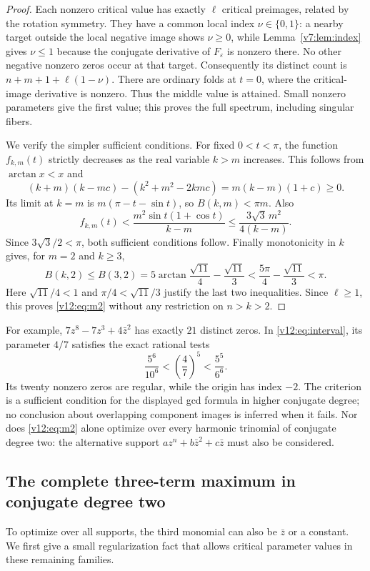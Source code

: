 \documentclass[UTF8,11pt]{ctexart}
\theoremstyle{definition}
\numberwithin{equation}{section}
\begin{document}
\begin{proof}
Each nonzero critical value has exactly $\ell$ critical preimages,
related by the rotation symmetry. They have a common local index
$\nu\in\{0,1\}$: a nearby target outside the local negative image
shows $\nu\ge0$, while Lemma~\ref{v7:lem:index} gives $\nu\le1$
because the conjugate derivative of $F_\varepsilon$ is nonzero
there. No other negative nonzero zeros occur at that target.
Consequently its distinct count is
$n+m+1+\ell(1-\nu)$. There are ordinary folds at $t=0$,
where the critical-image derivative is nonzero. Thus the middle
value is attained. Small nonzero parameters give the first value;
this proves the full spectrum, including singular fibers.

We verify the simpler sufficient conditions. For fixed $0<t<\pi$,
the function $f_{k,m}(t)$ strictly decreases as the real variable
$k>m$ increases. This follows from $\arctan x<x$ and
\[
 (k+m)(k-mc)-(k^2+m^2-2kmc)=m(k-m)(1+c)\ge0.
\]
Its limit at $k=m$ is $m(\pi-t-\sin t)$, so $B(k,m)<\pi m$.
Also
\[
 f_{k,m}(t)<\frac{m^2\sin t(1+\cos t)}{k-m}
 \le\frac{3\sqrt3\,m^2}{4(k-m)}.
\]
Since $3\sqrt3/2<\pi$, both sufficient conditions follow.
Finally monotonicity in $k$ gives, for $m=2$ and $k\ge3$,
\[
 B(k,2)\le B(3,2)
 =5\arctan\frac{\sqrt{11}}4-\frac{\sqrt{11}}3
 <\frac{5\pi}{4}-\frac{\sqrt{11}}3<\pi.
\]
Here $\sqrt{11}/4<1$ and $\pi/4<\sqrt{11}/3$ justify the
last two inequalities. Since $\ell\ge1$, this proves
\eqref{v12:eq:m2} without any restriction on $n>k>2$.
\end{proof}

For example, $7z^8-7z^3+4\bar z^2$ has exactly $21$ distinct
zeros. In \eqref{v12:eq:interval}, its parameter $4/7$ satisfies
the exact rational tests
\[
 \frac{5^6}{10^6}<\left(\frac47\right)^5
 <\frac{5^5}{6^6}.
\]
Its twenty nonzero zeros are regular, while the origin has index
$-2$. The criterion is a sufficient condition for the displayed
gcd formula in higher conjugate degree; no conclusion about
overlapping component images is inferred when it fails.
Nor does \eqref{v12:eq:m2} alone optimize over every harmonic
trinomial of conjugate degree two: the alternative support
$az^n+b\bar z^2+c\bar z$ must also be considered.


\subsection{The complete three-term maximum in conjugate degree two}
\label{v13:sec:quadraticsparse}

To optimize over all supports, the third monomial can also be
$\bar z$ or a constant. We first give a small regularization fact
that allows critical parameter values in these remaining families.
\end{document}
